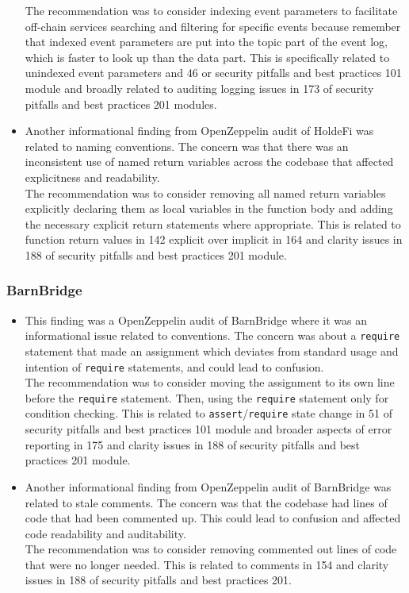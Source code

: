 \begin{itemize}
  The recommendation was to consider indexing event parameters to
  facilitate off-chain services searching and filtering for specific
  events because remember that indexed event parameters are put into the
  topic part of the event log, which is faster to look up than the data
  part. This is specifically related to unindexed event parameters and
  46 or security pitfalls and best practices 101 module and broadly
  related to auditing logging issues in 173 of security pitfalls and
  best practices 201 modules.
\item
  Another informational finding from OpenZeppelin audit of HoldeFi was
  related to naming conventions. The concern was that there was an
  inconsistent use of named return variables across the codebase that
  affected explicitness and readability.\\

  The recommendation was to consider removing all named return variables
  explicitly declaring them as local variables in the function body and
  adding the necessary explicit return statements where appropriate.
  This is related to function return values in 142 explicit over
  implicit in 164 and clarity issues in 188 of security pitfalls and
  best practices 201 module.
\end{itemize}

\subsubsection{BarnBridge}\label{barnbridge}

\begin{itemize}
\item
  This finding was a OpenZeppelin audit of BarnBridge where it was an
  informational issue related to conventions. The concern was about a
  \texttt{require} statement that made an assignment which deviates from
  standard usage and intention of \texttt{require} statements, and could
  lead to confusion.\\

  The recommendation was to consider moving the assignment to its own
  line before the \texttt{require} statement. Then, using the
  \texttt{require} statement only for condition checking. This is
  related to \texttt{assert}/\texttt{require} state change in 51 of
  security pitfalls and best practices 101 module and broader aspects of
  error reporting in 175 and clarity issues in 188 of security pitfalls
  and best practices 201 module.
\item
  Another informational finding from OpenZeppelin audit of BarnBridge
  was related to stale comments. The concern was that the codebase had
  lines of code that had been commented up. This could lead to confusion
  and affected code readability and auditability.\\

  The recommendation was to consider removing commented out lines of
  code that were no longer needed. This is related to comments in 154
  and clarity issues in 188 of security pitfalls and best practices 201.
\end{itemize}

